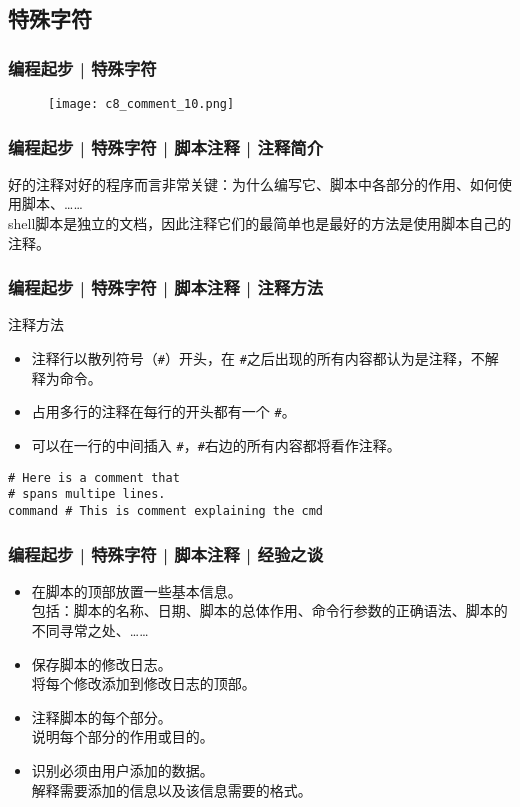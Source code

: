 \subsection{特殊字符}
\begin{frame}
  \frametitle{编程起步 | \alert{特殊字符}}
  \begin{figure}
    \centering
    \texttt{[image: c8\_comment\_10.png]}
  \end{figure}
\end{frame}

\begin{frame}
  \frametitle{编程起步 | 特殊字符 | 脚本注释 | 注释简介}
  好的注释对好的程序而言非常关键：为什么编写它、脚本中各部分的作用、如何使用脚本、……\\
  \vspace{0.5em}
  shell脚本是独立的文档，因此注释它们的最简单也是最好的方法是使用脚本自己的注释。
\end{frame}

\begin{frame}[fragile]
  \frametitle{编程起步 | 特殊字符 | 脚本注释 | \alert{注释方法}}
  \begin{block}{注释方法}
    \begin{itemize}
      \item 注释行以散列符号（\verb|#|）开头，在 \verb|#|之后出现的所有内容都认为是注释，不解释为命令。
      \item 占用多行的注释在每行的开头都有一个 \verb|#|。
      \item 可以在一行的中间插入 \verb|#|，\verb|#|右边的所有内容都将看作注释。
    \end{itemize}
  \end{block}
  \pause
\begin{lstlisting}
# Here is a comment that
# spans multipe lines.
command # This is comment explaining the cmd
\end{lstlisting}
\end{frame}

\begin{frame}
  \frametitle{编程起步 | 特殊字符 | 脚本注释 | 经验之谈}
  \begin{itemize}
    \item 在脚本的顶部放置一些基本信息。\\ \qquad 包括：脚本的名称、日期、脚本的总体作用、命令行参数的正确语法、脚本的不同寻常之处、……
    \item 保存脚本的修改日志。\\ \qquad 将每个修改添加到修改日志的顶部。
    \item 注释脚本的每个部分。\\ \qquad 说明每个部分的作用或目的。
    \item 识别必须由用户添加的数据。\\ \qquad 解释需要添加的信息以及该信息需要的格式。
  \end{itemize}
\end{frame}

